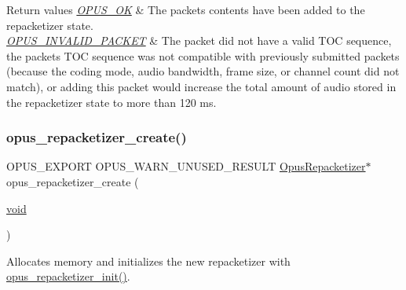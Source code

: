\begin{DoxyRetVals}{Return values}
{\em \hyperlink{group__opus__errorcodes_gaa44cf8a185e1b5cb940ef63eb4f02d21}{O\+P\+U\+S\+\_\+\+OK}} & The packet\textquotesingle{}s contents have been added to the repacketizer state. \\
\hline
{\em \hyperlink{group__opus__errorcodes_ga46fc9dd493fb8e291bd8e838f0988bb7}{O\+P\+U\+S\+\_\+\+I\+N\+V\+A\+L\+I\+D\+\_\+\+P\+A\+C\+K\+ET}} & The packet did not have a valid T\+OC sequence, the packet\textquotesingle{}s T\+OC sequence was not compatible with previously submitted packets (because the coding mode, audio bandwidth, frame size, or channel count did not match), or adding this packet would increase the total amount of audio stored in the repacketizer state to more than 120 ms. \\
\hline
\end{DoxyRetVals}
\mbox{\label{group__opus__repacketizer_gaa70e9708619188f673b5dc3f494c46ea}} 
\subsubsection{\texorpdfstring{opus\+\_\+repacketizer\+\_\+create()}{opus\_repacketizer\_create()}}
{\footnotesize\ttfamily O\+P\+U\+S\+\_\+\+E\+X\+P\+O\+RT O\+P\+U\+S\+\_\+\+W\+A\+R\+N\+\_\+\+U\+N\+U\+S\+E\+D\+\_\+\+R\+E\+S\+U\+LT \hyperlink{group__opus__repacketizer_ga1f85070a64bcbf5bf24f5ccb80323e7b}{Opus\+Repacketizer}$\ast$ opus\+\_\+repacketizer\+\_\+create (\begin{DoxyParamCaption}\item[{\hyperlink{png_8h_ac9c84fa68bbad002983e35ce3663c686}{void}}]{ }\end{DoxyParamCaption})}

Allocates memory and initializes the new repacketizer with \hyperlink{group__opus__repacketizer_gadef533688e80dcc96a32b955657aaf28}{opus\+\_\+repacketizer\+\_\+init()}. \mbox{\label{group__opus__repacketizer_gab03f22d1139a42e450761ad99ca3d882}} 
